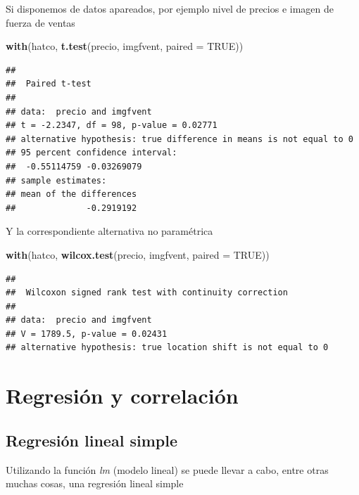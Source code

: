 \documentclass[]{book}
\newenvironment{Shaded}{\begin{snugshade}}{\end{snugshade}}
\newcommand{\DataTypeTok}[1]{\textcolor[rgb]{0.13,0.29,0.53}{#1}}
\newcommand{\KeywordTok}[1]{\textcolor[rgb]{0.13,0.29,0.53}{\textbf{#1}}}
\newcommand{\NormalTok}[1]{#1}
\newcommand{\OtherTok}[1]{\textcolor[rgb]{0.56,0.35,0.01}{#1}}
\begin{document}
Si disponemos de datos apareados, por ejemplo nivel de precios e imagen
de fuerza de ventas

\begin{Shaded}
\begin{Highlighting}[]
\KeywordTok{with}\NormalTok{(hatco, }\KeywordTok{t.test}\NormalTok{(precio, imgfvent, }\DataTypeTok{paired =} \OtherTok{TRUE}\NormalTok{))}
\end{Highlighting}
\end{Shaded}

\begin{verbatim}
## 
##  Paired t-test
## 
## data:  precio and imgfvent
## t = -2.2347, df = 98, p-value = 0.02771
## alternative hypothesis: true difference in means is not equal to 0
## 95 percent confidence interval:
##  -0.55114759 -0.03269079
## sample estimates:
## mean of the differences 
##              -0.2919192
\end{verbatim}

Y la correspondiente alternativa no paramétrica

\begin{Shaded}
\begin{Highlighting}[]
\KeywordTok{with}\NormalTok{(hatco, }\KeywordTok{wilcox.test}\NormalTok{(precio, imgfvent, }\DataTypeTok{paired =} \OtherTok{TRUE}\NormalTok{))}
\end{Highlighting}
\end{Shaded}

\begin{verbatim}
## 
##  Wilcoxon signed rank test with continuity correction
## 
## data:  precio and imgfvent
## V = 1789.5, p-value = 0.02431
## alternative hypothesis: true location shift is not equal to 0
\end{verbatim}

\hypertarget{regresion-y-correlacion}{%
\section{Regresión y correlación}\label{regresion-y-correlacion}}

\hypertarget{regresion-lineal-simple}{%
\subsection{Regresión lineal simple}\label{regresion-lineal-simple}}

Utilizando la función \emph{lm} (modelo lineal) se puede llevar a cabo, entre otras
muchas cosas, una regresión lineal simple
\end{document}
